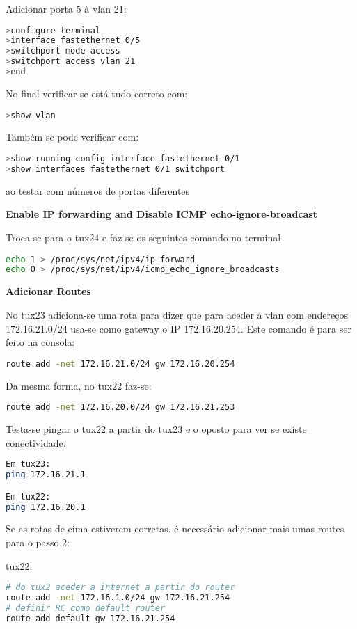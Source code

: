 Adicionar porta 5 à vlan 21:
\begin{lstlisting}[language=bash]
>configure terminal
>interface fastethernet 0/5             
>switchport mode access
>switchport access vlan 21
>end
\end{lstlisting}

No final verificar se está tudo correto com:
\begin{lstlisting}[language=bash]
>show vlan
\end{lstlisting}

Também se pode verificar com:
\begin{lstlisting}[language=bash]
>show running-config interface fastethernet 0/1
>show interfaces fastethernet 0/1 switchport
\end{lstlisting}
ao testar com números de portas diferentes

\textbf{Enable IP forwarding and Disable ICMP echo-ignore-broadcast}

Troca-se para o tux24 e faz-se os seguintes comando no terminal
\begin{lstlisting}[language=bash]
echo 1 > /proc/sys/net/ipv4/ip_forward
echo 0 > /proc/sys/net/ipv4/icmp_echo_ignore_broadcasts
\end{lstlisting}

\textbf{Adicionar Routes}

No tux23 adiciona-se uma rota para dizer que para aceder á vlan com endereços 172.16.21.0/24 usa-se como gateway o IP 172.16.20.254. Este comando é para ser feito na consola:
\begin{lstlisting}[language=bash]
route add -net 172.16.21.0/24 gw 172.16.20.254
\end{lstlisting}

Da mesma forma, no tux22 faz-se:
\begin{lstlisting}[language=bash]
route add -net 172.16.20.0/24 gw 172.16.21.253
\end{lstlisting}

Testa-se pingar o tux22 a partir do tux23 e o oposto para ver se existe conectividade.
\begin{lstlisting}[language=bash]
Em tux23:
ping 172.16.21.1

Em tux22:
ping 172.16.20.1
\end{lstlisting}

Se as rotas de cima estiverem corretas, é necessário adicionar mais umas routes para o passo 2:

tux22:
\begin{lstlisting}[language=bash]
# do tux2 aceder a internet a partir do router
route add -net 172.16.1.0/24 gw 172.16.21.254
# definir RC como default router
route add default gw 172.16.21.254
\end{lstlisting}

